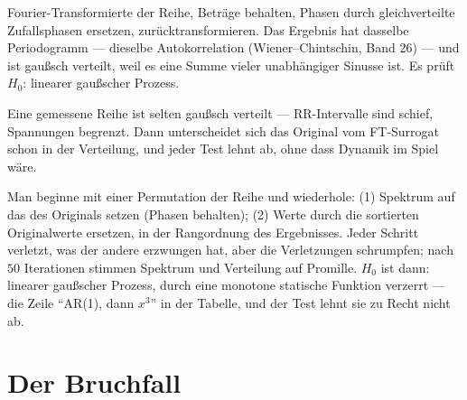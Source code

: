 \begin{merksatz}
Fourier-Transformierte der Reihe, Beträge behalten, Phasen durch gleichverteilte Zufallsphasen ersetzen, zurücktransformieren. Das Ergebnis hat dasselbe Periodogramm --- dieselbe Autokorrelation (Wiener--Chintschin, Band 26) --- und ist gaußsch verteilt, weil es eine Summe vieler unabhängiger Sinusse ist. Es prüft $H_0$: linearer gaußscher Prozess.

Eine gemessene Reihe ist selten gaußsch verteilt --- RR-Intervalle sind schief, Spannungen begrenzt. Dann unterscheidet sich das Original vom FT-Surrogat schon in der Verteilung, und jeder Test lehnt ab, ohne dass Dynamik im Spiel wäre.

Man beginne mit einer Permutation der Reihe und wiederhole: (1) Spektrum auf das des Originals setzen (Phasen behalten); (2) Werte durch die sortierten Originalwerte ersetzen, in der Rangordnung des Ergebnisses. Jeder Schritt verletzt, was der andere erzwungen hat, aber die Verletzungen schrumpfen; nach $50$ Iterationen stimmen Spektrum und Verteilung auf Promille. $H_0$ ist dann: linearer gaußscher Prozess, durch eine monotone statische Funktion verzerrt --- die Zeile \enquote{AR(1), dann $x^{3}$} in der Tabelle, und der Test lehnt sie zu Recht nicht ab.

\begin{center}
\begin{minipage}{0.88\textwidth}
\end{minipage}
\end{center}
\end{merksatz}

\section{Der Bruchfall}

